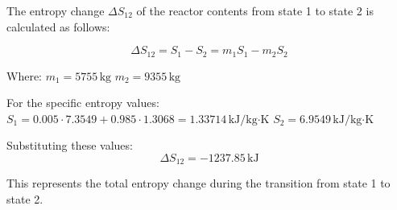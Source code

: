 The entropy change \( \Delta S_{12} \) of the reactor contents from state 1 to state 2 is calculated as follows:

\[
\Delta S_{12} = S_1 - S_2 = m_1 S_1 - m_2 S_2
\]

Where:  
\( m_1 = 5755 \, \text{kg} \)  
\( m_2 = 9355 \, \text{kg} \)  

For the specific entropy values:  
\( S_1 = 0.005 \cdot 7.3549 + 0.985 \cdot 1.3068 = 1.33714 \, \text{kJ/kg·K} \)  
\( S_2 = 6.9549 \, \text{kJ/kg·K} \)  

Substituting these values:  
\[
\Delta S_{12} = -1237.85 \, \text{kJ}
\]  

This represents the total entropy change during the transition from state 1 to state 2.